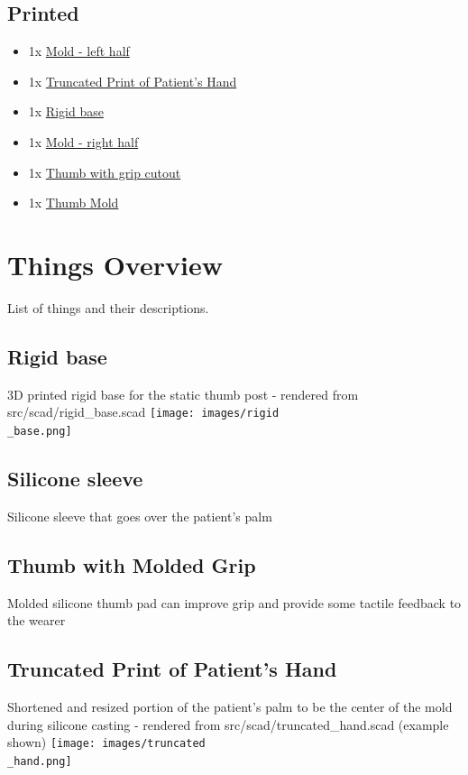\documentclass[11pt]{article}
\begin{document}
\subsection{Printed}
\begin{itemize}
\item 1x \hyperlink{thing_mold\_left\_half}{Mold - left half}
\item 1x \hyperlink{thing_truncated\_hand}{Truncated Print of Patient's Hand}
\item 1x \hyperlink{thing_rigid\_base}{Rigid base}
\item 1x \hyperlink{thing_mold\_right\_half}{Mold - right half}
\item 1x \hyperlink{thing_thumb\_with\_grip\_cutout}{Thumb with grip cutout}
\item 1x \hyperlink{thing_thumb\_mold}{Thumb Mold}
\end{itemize}

\newpage

\section{Things Overview}
List of things and their descriptions.

\hypertarget{thing_rigid\_base}{\subsection{Rigid base}}
3D printed rigid base for the static thumb post - rendered from src/scad/rigid_base.scad
\texttt{[image: images/rigid\\\_base.png]}

\hypertarget{thing_silicone\_sleeve}{\subsection{Silicone sleeve}}
Silicone sleeve that goes over the patient's palm

\hypertarget{thing_molded\_thumb}{\subsection{Thumb with Molded Grip}}
Molded silicone thumb pad can improve grip and provide some tactile feedback to the wearer

\hypertarget{thing_truncated\_hand}{\subsection{Truncated Print of Patient's Hand}}
Shortened and resized portion of the patient's palm to be the center of the mold during silicone casting - rendered from src/scad/truncated_hand.scad (example shown)
\texttt{[image: images/truncated\\\_hand.png]}
\end{document}
